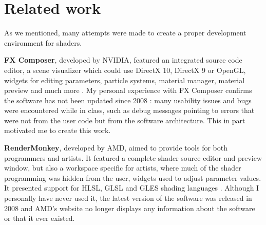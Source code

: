 \section{Related work}
As we mentioned, many attempts were made to create a proper development environment for shaders.

\textbf{FX Composer}, developed by NVIDIA, featured an integrated source code editor, a scene visualizer which could use DirectX 10, DirectX 9 or OpenGL, widgets for editing parameters, particle systems, material manager, material preview and much more \cite{fxcomposer}. My personal experience with FX Composer confirms the software has not been updated since 2008 \cite{fxcomposer_release_notes}: many usability issues and bugs were encountered while in class, such as debug messages pointing to errors that were not from the user code but from the software architecture. This in part motivated me to create this work.

\textbf{RenderMonkey}, developed by AMD, aimed to provide tools for both programmers and artists. It featured a complete shader source editor and preview window, but also a workspace specific for artists, where much of the shader programming was hidden from the user, widgets used to adjust parameter values. It presented support for HLSL, GLSL and GLES shading languages \cite{rendermonkey}. Although I personally have never used it, the latest version of the software was released in 2008 \cite{rendermonkey_release_notes} and AMD's website no longer displays any information about the software or that it ever existed.
